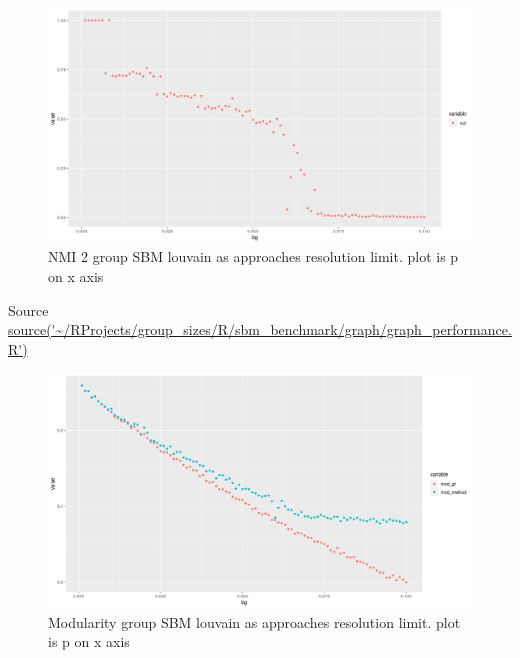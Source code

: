 \begin{figure}
    \centering
    \includegraphics[width=\textwidth]{images/Rplot_rough_sbm_nmi_louvain.png}
    \caption{NMI 2 group SBM louvain as approaches resolution limit. plot is p on x axis}
    \label{fig:my_rough_louvain sbm_nmi}
\end{figure}
Source \url{source('~/RProjects/group_sizes/R/sbm_benchmark/graph/graph_performance.R')}
\begin{figure}
    \centering
    \includegraphics[width=\textwidth]{images/Rplot_rough_modularity_lou_ground_truth.png}
    \caption{Modularity group SBM louvain as approaches resolution limit. plot is p on x axis}
    \label{fig:my_rough_louvain modularity}
\end{figure}


